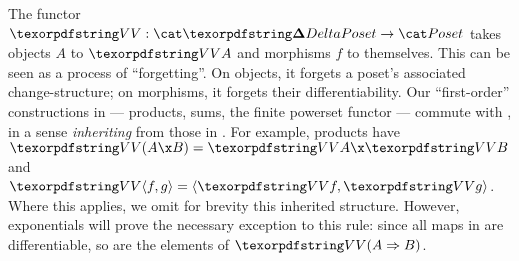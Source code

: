 The functor $\valfn : \CP \to \Poset$ takes objects $A$ to $\vals A$ and
morphisms $f$ to themselves. This can be seen as a process of ``forgetting''. On
objects, it forgets a poset's associated change-structure; on morphisms, it
forgets their differentiability.
%
Our ``first-order'' constructions in \CP{} --- products, sums, the finite
powerset functor --- commute with \valfn, in a sense \emph{inheriting} from
those in \Poset. For example, products have $\vals{(A \x B)} = \vals A \x \vals
B$ and $\vals{\fork{f,g}} = \fork{\vals f, \vals g}$.
%
Where this applies, we omit for brevity this inherited structure.
%
However, exponentials will prove the necessary exception to this rule: since all
maps in \CP{} are differentiable, so are the elements of $\vals{(\expO A B)}$.












